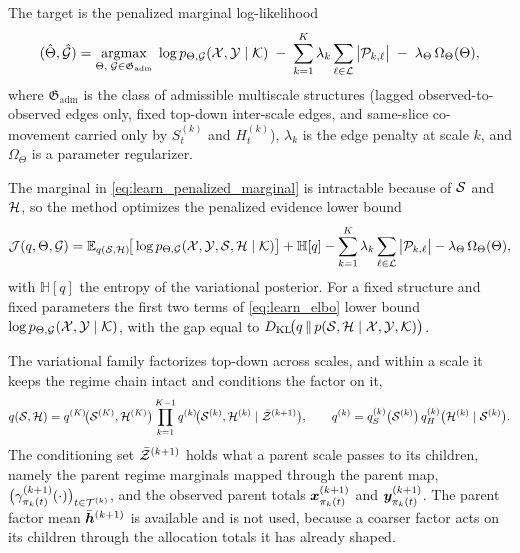 The target is the penalized marginal log-likelihood
\begin{align}
(\hat{\Theta}, \hat{{\mathcal{G}}})
=
\operatorname*{argmax}_{\Theta,\;{\mathcal{G}} \in \mathfrak{G}_{\mathrm{adm}}}
\;
\log p_{\Theta,{\mathcal{G}}}({\mathcal{X}},{\mathcal{Y}} \mid {\mathcal{K}})
\;-\;
\sum_{k=1}^{K} \lambda_k \sum_{\ell \in {\mathcal{L}}} \big|{\mathcal{P}}_{k,\ell}\big|
\;-\;
\lambda_\Theta \, \Omega_\Theta(\Theta),
\label{eq:learn_penalized_marginal}
\end{align}
where $\mathfrak{G}_{\mathrm{adm}}$ is the class of admissible multiscale structures (lagged
observed-to-observed edges only, fixed top-down inter-scale edges, and same-slice co-movement
carried only by $S_t^{(k)}$ and $H_t^{(k)}$), $\lambda_k$ is the edge penalty at scale $k$, and
$\Omega_\Theta$ is a parameter regularizer.

The marginal in \cref{eq:learn_penalized_marginal} is intractable because of ${\mathcal{S}}$ and ${\mathcal{H}}$, so
the method optimizes the penalized evidence lower bound
\begin{align}
{\mathcal{J}}(q,\Theta,{\mathcal{G}})
=
\mathbb{E}_{q({\mathcal{S}},{\mathcal{H}})}\!\big[\log p_{\Theta,{\mathcal{G}}}({\mathcal{X}},{\mathcal{Y}},{\mathcal{S}},{\mathcal{H}} \mid {\mathcal{K}})\big]
+
\mathbb{H}[q]
-
\sum_{k=1}^{K} \lambda_k \sum_{\ell \in {\mathcal{L}}} \big|{\mathcal{P}}_{k,\ell}\big|
-
\lambda_\Theta \, \Omega_\Theta(\Theta),
\label{eq:learn_elbo}
\end{align}
with $\mathbb{H}[q]$ the entropy of the variational posterior. For a fixed structure and fixed
parameters the first two terms of \cref{eq:learn_elbo} lower bound
$\log p_{\Theta,{\mathcal{G}}}({\mathcal{X}},{\mathcal{Y}} \mid {\mathcal{K}})$, with the gap equal to
$D_{\mathrm{KL}}\!\big(q \,\|\, p({\mathcal{S}},{\mathcal{H}} \mid {\mathcal{X}},{\mathcal{Y}},{\mathcal{K}})\big)$.

The variational family factorizes top-down across scales, and within a scale it keeps the regime
chain intact and conditions the factor on it,
\begin{align}
q({\mathcal{S}},{\mathcal{H}})
=
q^{(K)}\!\big({\mathcal{S}}^{(K)},{\mathcal{H}}^{(K)}\big)
\prod_{k=1}^{K-1}
q^{(k)}\!\big({\mathcal{S}}^{(k)},{\mathcal{H}}^{(k)} \mid \bar{{\mathcal{Z}}}^{(k+1)}\big),
\qquad
q^{(k)} = q_S^{(k)}\big({\mathcal{S}}^{(k)}\big)\, q_H^{(k)}\big({\mathcal{H}}^{(k)} \mid {\mathcal{S}}^{(k)}\big).
\label{eq:learn_variational_family}
\end{align}
The conditioning set $\bar{{\mathcal{Z}}}^{(k+1)}$ holds what a parent scale passes to its children, namely
the parent regime marginals mapped through the parent map,
$\big(\gamma^{(k+1)}_{\pi_k(t)}(\cdot)\big)_{t \in {\mathcal{T}}^{(k)}}$, and the observed parent totals
${\bm{x}}_{\pi_k(t)}^{(k+1)}$ and ${\bm{y}}_{\pi_k(t)}^{(k+1)}$. The parent factor mean
$\bar{{\bm{h}}}^{(k+1)}$ is available and is not used, because a coarser factor acts on its children
through the allocation totals it has already shaped.

